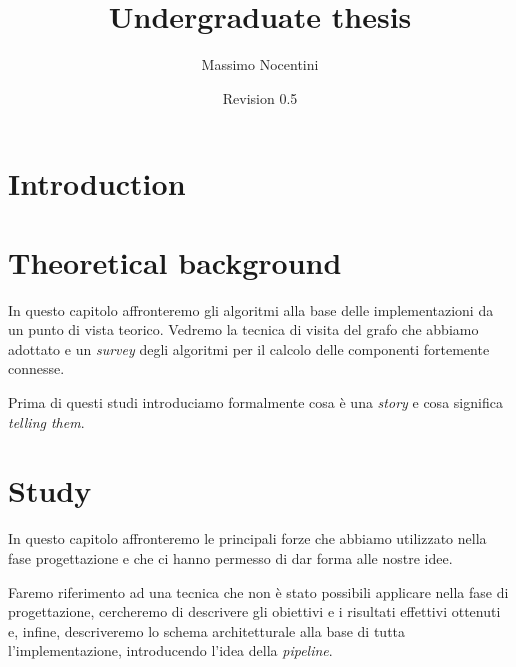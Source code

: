 \documentclass[8pt, a4paper]{report}
\title{Undergraduate thesis}
\author{Massimo Nocentini}
\date{Revision 0.5}
\begin{document}
\lstset{
	language = java
	, numbers = left 
	, basicstyle=\sffamily%
	, tabsize=2
	, captionpos=b
	, breaklines=true
	, showspaces=false
	, showstringspaces=false
}

\maketitle

\tableofcontents

\newpage


% 

% 

\chapter{Introduction}
\label{chapter:introduction}



\chapter{Theoretical background}
\label{chapter:theoretical-background}

In questo capitolo affronteremo gli algoritmi alla base delle
implementazioni da un punto di vista teorico. Vedremo la tecnica di
visita del grafo che abbiamo adottato e un \emph{survey} degli
algoritmi per il calcolo delle componenti fortemente connesse.

Prima di questi studi introduciamo formalmente cosa \`e una
\emph{story} e cosa significa \emph{telling them}.



\chapter{Study}
\label{chapter:study}

In questo capitolo affronteremo le principali forze che abbiamo
utilizzato nella fase progettazione e che ci hanno permesso di dar
forma alle nostre idee. 

Faremo riferimento ad una tecnica che non \`e stato possibili
applicare nella fase di progettazione, cercheremo di descrivere gli
obiettivi e i risultati effettivi ottenuti e, infine, descriveremo lo
schema architetturale alla base di tutta l'implementazione,
introducendo l'idea della \emph{pipeline}.
\end{document}
